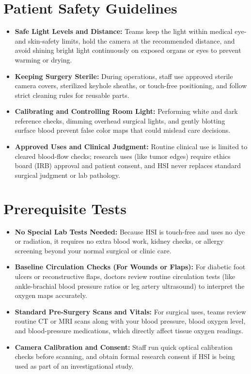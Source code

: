 \section{Patient Safety Guidelines}
\begin{itemize}
    \item \textbf{Safe Light Levels and Distance:} Teams keep the light within medical eye- and skin-safety limits, hold the camera at the recommended distance, and avoid shining bright light continuously on exposed organs or eyes to prevent warming or drying.
    \item \textbf{Keeping Surgery Sterile:} During operations, staff use approved sterile camera covers, sterilized keyhole sheaths, or touch-free positioning, and follow strict cleaning rules for reusable parts.
    \item \textbf{Calibrating and Controlling Room Light:} Performing white and dark reference checks, dimming overhead surgical lights, and gently blotting surface blood prevent false color maps that could mislead care decisions.
    \item \textbf{Approved Uses and Clinical Judgment:} Routine clinical use is limited to cleared blood-flow checks; research uses (like tumor edges) require ethics board (IRB) approval and patient consent, and HSI never replaces standard surgical judgment or lab pathology.
\end{itemize}

\section{Prerequisite Tests}
\begin{itemize}
    \item \textbf{No Special Lab Tests Needed:} Because HSI is touch-free and uses no dye or radiation, it requires no extra blood work, kidney checks, or allergy screening beyond your normal surgical or clinic care.
    \item \textbf{Baseline Circulation Checks (For Wounds or Flaps):} For diabetic foot ulcers or reconstructive flaps, doctors review routine circulation tests (like ankle-brachial blood pressure ratios or leg artery ultrasound) to interpret the oxygen maps accurately.
    \item \textbf{Standard Pre-Surgery Scans and Vitals:} For surgical uses, teams review routine CT or MRI scans along with your blood pressure, blood oxygen level, and blood-pressure medications, which directly affect tissue oxygen readings.
    \item \textbf{Camera Calibration and Consent:} Staff run quick optical calibration checks before scanning, and obtain formal research consent if HSI is being used as part of an investigational study.
\end{itemize}

